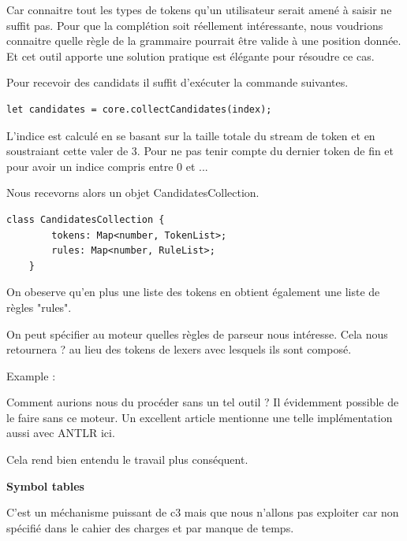 \documentclass[
    iict, %
    il, %
]{heig-tb}
\begin{document}
Car connaitre tout les types de tokens qu'un utilisateur serait amené à saisir ne suffit pas. Pour que la complétion soit réellement intéressante, nous voudrions connaitre quelle règle de la grammaire pourrait être valide à une position donnée.
Et cet outil apporte une solution pratique est élégante pour résoudre ce cas.


Pour recevoir des candidats il suffit d'exécuter la commande suivantes.

\begin{lstlisting}[frame=single]
    let candidates = core.collectCandidates(index);
\end{lstlisting}

L'indice est calculé en se basant sur la taille totale du stream de token et en soustraiant cette valer de 3.
Pour ne pas tenir compte du dernier token de fin et pour avoir un indice compris entre 0 et ...

Nous recevorns alors un objet CandidatesCollection.

\begin{lstlisting}[frame=single]
    class CandidatesCollection {
        tokens: Map<number, TokenList>;
        rules: Map<number, RuleList>;
    }
\end{lstlisting}


On obeserve qu'en plus une liste des tokens en obtient également une liste de règles "rules".


On peut spécifier au moteur quelles règles de parseur nous intéresse. Cela nous retournera ? au lieu des tokens de lexers avec lesquels ils sont composé.

Example :


Comment aurions nous du procéder sans un tel outil ?
Il évidemment possible de le faire sans ce moteur. Un excellent article mentionne une telle implémentation aussi avec ANTLR ici.

Cela rend bien entendu le travail plus conséquent.



\textbf{Symbol tables}

C'est un méchanisme puissant de c3 mais que nous n'allons pas exploiter car non spécifié dans le cahier des charges et par manque de temps.
\end{document}
